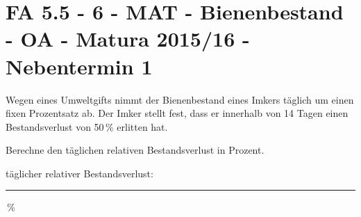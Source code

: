 \section{FA 5.5 - 6 - MAT - Bienenbestand - OA - Matura 2015/16 - Nebentermin 1}

\begin{beispiel}[FA 5.5]{1} %
Wegen eines Umweltgifts nimmt der Bienenbestand eines Imkers täglich um einen fixen Prozentsatz
ab. Der Imker stellt fest, dass er innerhalb von 14 Tagen einen Bestandsverlust von 50\,\%
erlitten hat.\leer

Berechne den täglichen relativen Bestandsverlust in Prozent. \leer

täglicher relativer Bestandsverlust:\rule{4cm}{0.3pt}\,\%

\end{beispiel}